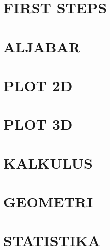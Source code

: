 \documentclass[12pt,times new roman,a4paper]{book}
\begin{document}
\begin{eulernotebook}
    \chapter{FIRST STEPS}
    

    \chapter{ALJABAR}
    

    

    

    \chapter{PLOT 2D}
    

    \chapter{PLOT 3D}
    

    \chapter{KALKULUS}
    

    \chapter{GEOMETRI}
    

    \chapter{STATISTIKA}
    
\end{eulernotebook}
\end{document}
